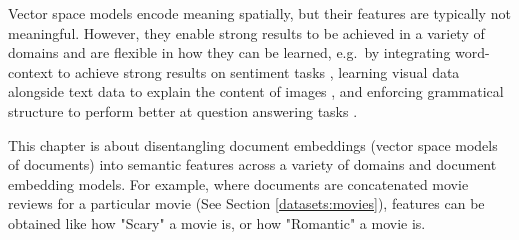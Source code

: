 

%





Vector space models encode meaning spatially, but their features are typically not meaningful. However, they enable strong results to be achieved in a variety of domains and   are flexible in how they can be learned, e.g.\ by integrating word-context  to achieve strong results on sentiment tasks \cite{Pennington2014}, learning visual data alongside text data to explain the content of images \cite{Mao2014a}, and enforcing grammatical structure to perform better at question answering tasks \cite{Palangi2017}. 



This chapter is about disentangling document embeddings (vector space models of documents) into semantic features across a variety of domains and document embedding models. For example, where documents are concatenated movie reviews for a particular movie (See Section \ref{datasets:movies}), features can be obtained like how "Scary" a movie is, or how "Romantic" a movie is.


